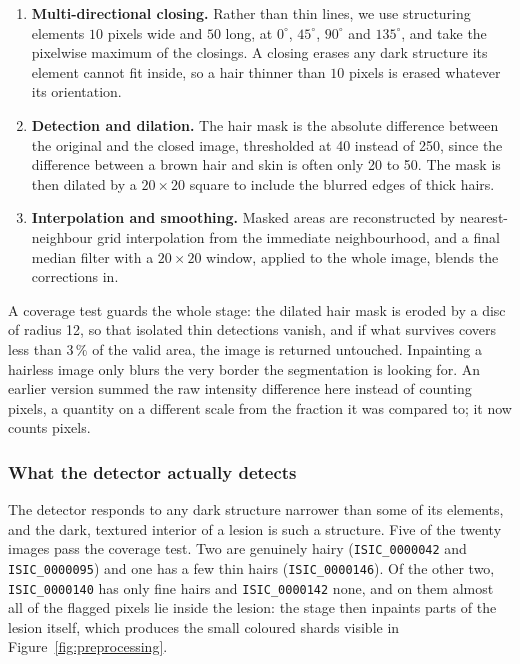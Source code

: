 \documentclass[11pt,a4paper]{article}
\begin{document}
\begin{enumerate}
  \item \textbf{Multi-directional closing.} Rather than thin lines, we use
  structuring elements $10$ pixels wide and $50$ long, at $0^\circ$, $45^\circ$,
  $90^\circ$ and $135^\circ$, and take the pixelwise maximum of the closings. A
  closing erases any dark structure its element cannot fit inside, so a hair
  thinner than $10$ pixels is erased whatever its orientation.
  \item \textbf{Detection and dilation.} The hair mask is the absolute
  difference between the original and the closed image, thresholded at 40
  instead of 250, since the difference between a brown hair and skin is often
  only 20 to 50. The mask is then dilated by a $20 \times 20$ square to include
  the blurred edges of thick hairs.
  \item \textbf{Interpolation and smoothing.} Masked areas are reconstructed by
  nearest-neighbour grid interpolation from the immediate neighbourhood, and a
  final median filter with a $20 \times 20$ window, applied to the whole image,
  blends the corrections in.
\end{enumerate}

A coverage test guards the whole stage: the dilated hair mask is eroded by a
disc of radius 12, so that isolated thin detections vanish, and if what
survives covers less than $3\,\%$ of the valid area, the image is returned
untouched. Inpainting a hairless image only blurs the very border the
segmentation is looking for. An earlier version summed the raw intensity
difference here instead of counting pixels, a quantity on a different scale
from the fraction it was compared to; it now counts pixels.

\subsubsection{What the detector actually detects}
\label{sec:hair-limits}

The detector responds to any dark structure narrower than some of its
elements, and the dark, textured interior of a lesion is such a structure.
Five of the twenty images pass the coverage test. Two are genuinely hairy
(\texttt{ISIC\_0000042} and \texttt{ISIC\_0000095}) and one has a few thin
hairs (\texttt{ISIC\_0000146}). Of the other two, \texttt{ISIC\_0000140} has
only fine hairs and \texttt{ISIC\_0000142} none, and on them almost all of the
flagged pixels lie inside the lesion: the stage then inpaints parts of the
lesion itself, which produces the small coloured shards visible in
Figure~\ref{fig:preprocessing}.
\end{document}
